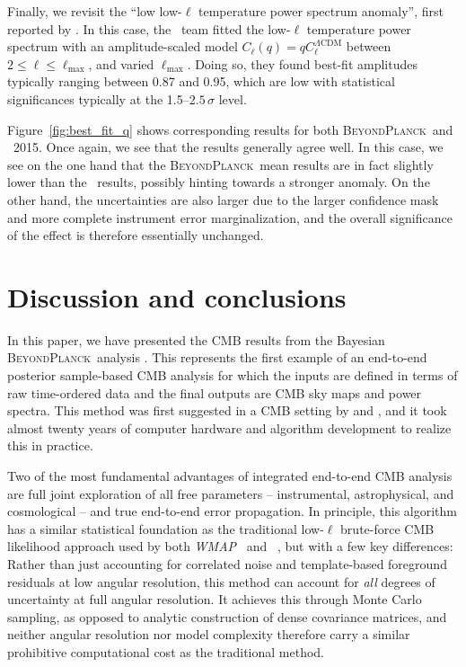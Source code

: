 \documentclass[twocolumn]{aa}
\def\WMAP{\textit{WMAP}}
\newcommand{\BP}{\textsc{BeyondPlanck}}
\begin{document}
Finally, we revisit the ``low low-$\ell$ temperature power spectrum
anomaly'', first reported by \citet{planck2013-p08} \citep[an analogous result at the angular correlation function level had been previously observed in \WMAP\ data, albeit at lower significance level, e.g.][]{Bennett_2011}. In this case, the \Planck\ team fitted the low-$\ell$ temperature power spectrum with an
amplitude-scaled model $C_{\ell}(q) = q C^{\Lambda
  \textrm{CDM}}_{\ell}$ between $2\le\ell\le\ell_{\mathrm{max}}$, and
varied $\ell_{\mathrm{max}}$. Doing so, they found best-fit amplitudes
typically ranging between 0.87 and 0.95, which are low with
statistical significances typically at the 1.5--$2.5\,\sigma$ level.

Figure~\ref{fig:best_fit_q} shows corresponding results for both
\BP\ and \Planck\ 2015. Once again, we see that the results generally
agree well. In this case, we see on the one hand that the \BP\ mean
results are in fact slightly lower than the \Planck\ results, possibly
hinting towards a stronger anomaly. On the other hand, the
uncertainties are also larger due to the larger confidence mask and
more complete instrument error marginalization, and the overall
significance of the effect is therefore essentially unchanged.

\section{Discussion and conclusions}
\label{sec:summary}

In this paper, we have presented the CMB results from the Bayesian
\BP\ analysis \citep{bp01}. This represents the first example of an
end-to-end posterior sample-based CMB analysis for which the inputs
are defined in terms of raw time-ordered data and the final outputs
are CMB sky maps and power spectra. This method was first suggested in
a CMB setting by \citet{jewell2004} and \citet{wandelt2004}, and it
took almost twenty years of computer hardware and algorithm
development to realize this in practice.

Two of the most fundamental advantages of integrated end-to-end CMB
analysis are full joint exploration of all free parameters --
instrumental, astrophysical, and cosmological -- and true end-to-end
error propagation. In principle, this algorithm has a similar
statistical foundation as the traditional low-$\ell$ brute-force CMB
likelihood approach used by both \WMAP\ \citep{hinshaw2012} and
\Planck\ \citep{planck2016-l05}, but with a few key differences:
Rather than just accounting for correlated noise and template-based
foreground residuals at low angular resolution, this method can
account for \emph{all} degrees of uncertainty at full angular
resolution. It achieves this through Monte Carlo sampling, as opposed
to analytic construction of dense covariance matrices, and neither
angular resolution nor model complexity therefore carry a similar
prohibitive computational cost as the traditional method.
\end{document}
